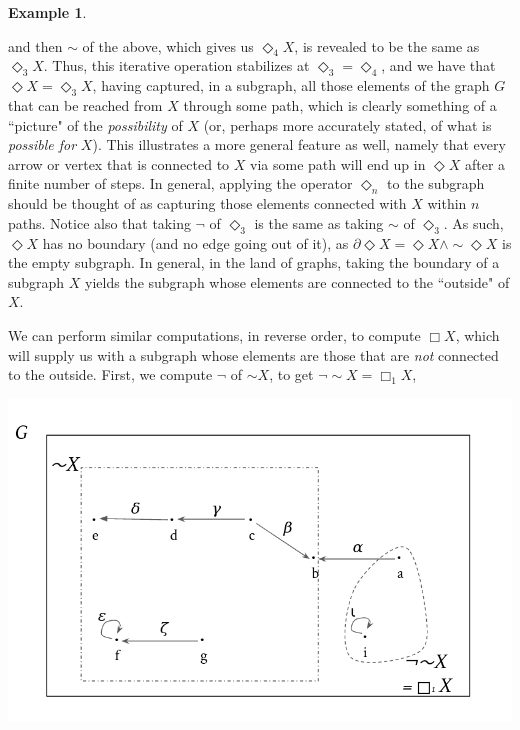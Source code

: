 \documentclass[a4paper]{book}
\theoremstyle{definition}
\newtheorem{example}{Example}[section]
\theoremstyle{definition}
\theoremstyle{definition}
\theoremstyle{theorem}
\theoremstyle{definition}
\begin{document}
\begin{example}
\begin{center}
	\end{center}  
	and then $\sim$ of the above, which gives us $\Diamond_4 X$, is revealed to be the same as $\Diamond_3 X$.
	Thus, this iterative operation stabilizes at $\Diamond_3 = \Diamond_4$, and we have that $\Diamond X = \Diamond_3 X$, having captured, in a subgraph, all those elements of the graph $G$ that can be reached from $X$ through some path, which is clearly something of a ``picture" of the \textit{possibility} of $X$ (or, perhaps more accurately stated, of what is \textit{possible for} $X$). This illustrates a more general feature as well, namely that every arrow or vertex that is connected to $X$ via some path will end up in $\Diamond X$ after a finite number of steps. In general, applying the operator $\Diamond_n$ to the subgraph should be thought of as capturing those elements connected with $X$ within $n$ paths. Notice also that taking $\neg$ of $\Diamond_3$ is the same as taking $\sim$ of $\Diamond_3$. As such, $\Diamond X$ has no boundary (and no edge going out of it), as $\partial \Diamond X = \Diamond X \wedge \sim \Diamond X$ is the empty subgraph. In general, in the land of graphs, taking the boundary of a subgraph $X$ yields the subgraph whose elements are connected to the ``outside" of $X$.\par 
	We can perform similar computations, in reverse order, to compute $\Box X$, which will supply us with a subgraph whose elements are those that are \textit{not} connected to the outside. First, we compute $\neg$ of $\sim X$, to get $\neg \sim X = \Box_1 X$, 
	\begin{center}
		\includegraphics*[scale=0.24]{GraphSubgraphNegation11.png}
	\end{center}       

\end{example}
\end{document}
